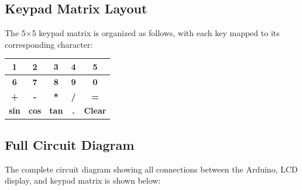 \documentclass[12pt]{article}
\begin{document}
	\subsection{Keypad Matrix Layout}
	The 5×5 keypad matrix is organized as follows, with each key mapped to its corresponding character:
	
	\begin{center}
		\begin{tabular}{|c|c|c|c|c|}
			\hline
			\textbf{1} & \textbf{2} & \textbf{3} & \textbf{4} & \textbf{5} \\
			\hline
			\textbf{6} & \textbf{7} & \textbf{8} & \textbf{9} & \textbf{0} \\
			\hline
			\textbf{+} & \textbf{-} & \textbf{*} & \textbf{/} & \textbf{=} \\
			\hline
			\textbf{sin} & \textbf{cos} & \textbf{tan} & \textbf{.} & \textbf{Clear} \\
			\hline
		\end{tabular}
	\end{center}
	
	\subsection{Full Circuit Diagram}
	The complete circuit diagram showing all connections between the Arduino, LCD display, and keypad matrix is shown below:
	
\end{document}
